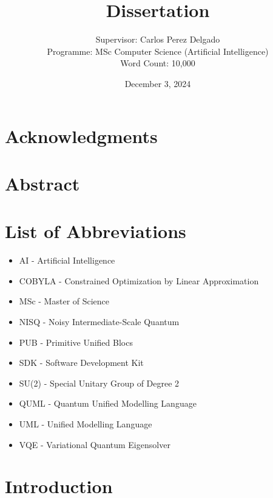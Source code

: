 \documentclass{article}
\title{Dissertation}
\author{Supervisor: Carlos Perez Delgado\\ Programme: MSc Computer Science (Artificial Intelligence) \\ Word Count: 10,000}
\date{December 3, 2024}
\begin{document}
\maketitle

\thispagestyle{empty} %

\newpage
\setcounter{page}{1}

\section*{Acknowledgments}
\newpage

\section*{Abstract}
\newpage

\listoffigures
\newpage

\listoftables
\newpage

\section*{List of Abbreviations}
\begin{itemize}
    \item AI - Artificial Intelligence
    \item COBYLA - Constrained Optimization by Linear Approximation
    \item MSc - Master of Science
    \item NISQ - Noisy Intermediate-Scale Quantum
    \item PUB - Primitive Unified Blocs
    \item SDK - Software Development Kit
    \item SU(2) - Special Unitary Group of Degree 2
    \item QUML - Quantum Unified Modelling Language
    \item UML - Unified Modelling Language
    \item VQE - Variational Quantum Eigensolver
\end{itemize}
\newpage

\tableofcontents

\newpage

\section{Introduction}
\end{document}
